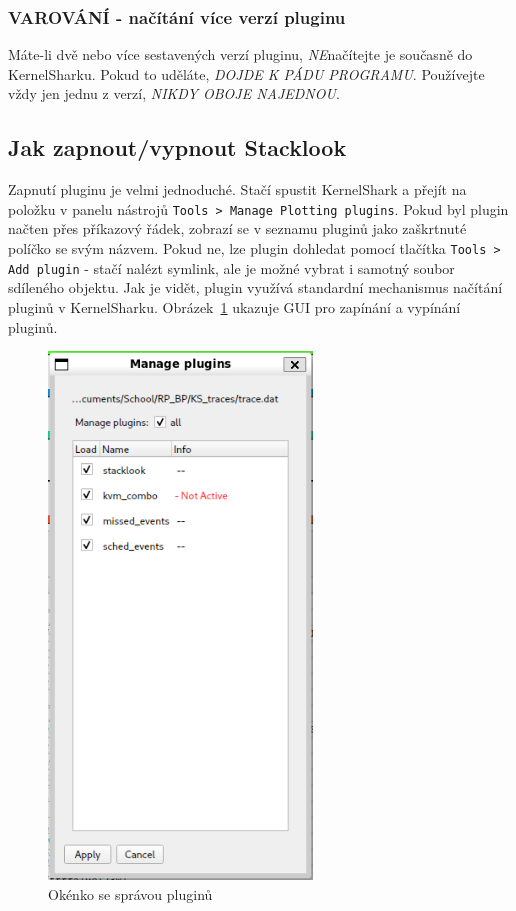 \subsubsection{VAROVÁNÍ - načítání více verzí pluginu}

Máte-li dvě nebo více sestavených verzí pluginu, \emph{NE}načítejte je současně do KernelSharku. Pokud to uděláte, \emph{DOJDE K PÁDU PROGRAMU}. Používejte vždy jen jednu z verzí, \emph{NIKDY OBOJE NAJEDNOU}.

\subsection{Jak zapnout/vypnout Stacklook}

Zapnutí pluginu je velmi jednoduché. Stačí spustit KernelShark a přejít na položku v panelu nástrojů \texttt{Tools > Manage Plotting plugins}. Pokud byl plugin načten přes příkazový řádek, zobrazí se v seznamu pluginů jako zaškrtnuté políčko se svým názvem. Pokud ne, lze plugin dohledat pomocí tlačítka \texttt{Tools > Add plugin} - stačí nalézt symlink, ale je možné vybrat i samotný soubor sdíleného objektu. Jak je vidět, plugin využívá standardní mechanismus načítání pluginů v KernelSharku. Obrázek~\ref{SlManagePlottingPlugins} ukazuje GUI pro zapínání a vypínání pluginů.

\begin{figure}[p]\centering
    \includegraphics[height=140mm]{img/Stacklook/SlManagePlottingPlugins}
    \caption{Okénko se správou pluginů}
    \label{SlManagePlottingPlugins}
\end{figure}

